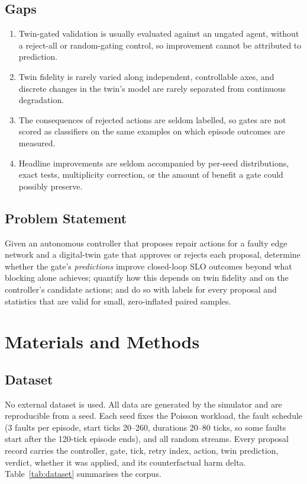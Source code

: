 \documentclass[conference]{IEEEtran}
\begin{document}
\subsection*{Gaps}

\begin{enumerate}
  \renewcommand{\labelenumi}{\textbf{G\arabic{enumi}.}}
  \item Twin-gated validation is usually evaluated against an ungated agent, without a reject-all or random-gating control, so improvement cannot be attributed to prediction.
  \item Twin fidelity is rarely varied along independent, controllable axes, and discrete changes in the twin's model are rarely separated from continuous degradation.
  \item The consequences of rejected actions are seldom labelled, so gates are not scored as classifiers on the same examples on which episode outcomes are measured.
  \item Headline improvements are seldom accompanied by per-seed distributions, exact tests, multiplicity correction, or the amount of benefit a gate could possibly preserve.
\end{enumerate}

\subsection*{Problem Statement}

Given an autonomous controller that proposes repair actions for a faulty edge network and a digital-twin gate that approves or rejects each proposal, determine whether the gate's \emph{predictions} improve closed-loop SLO outcomes beyond what blocking alone achieves; quantify how this depends on twin fidelity and on the controller's candidate actions; and do so with labels for every proposal and statistics that are valid for small, zero-inflated paired samples.

\section{Materials and Methods}

\subsection{Dataset}

No external dataset is used. All data are generated by the simulator and are reproducible from a seed. Each seed fixes the Poisson workload, the fault schedule (3 faults per episode, start ticks 20--260, durations 20--80 ticks, so some faults start after the 120-tick episode ends), and all random streams. Every proposal record carries the controller, gate, tick, retry index, action, twin prediction, verdict, whether it was applied, and its counterfactual harm delta. Table~\ref{tab:dataset} summarises the corpus.
\end{document}
